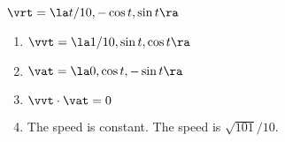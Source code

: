 {$\vrt = \la t/10,-\cos t,\sin t\ra$
}
{\begin{enumerate}
\item $\vvt = \la 1/10, \sin t, \cos t\ra$
\item $\vat = \la 0,\cos t, -\sin t \ra$
\item $\vvt \cdot \vat = 0$
\item The speed is constant.  The speed is $\sqrt{101}/10$.
\end{enumerate}
}

